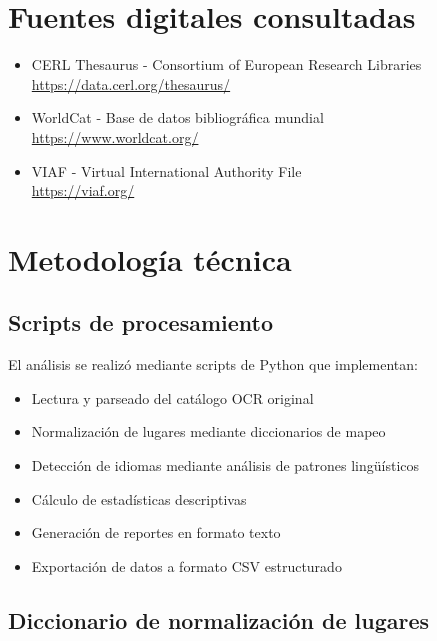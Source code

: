\documentclass[12pt,a4paper]{article}
\begin{document}
\section{Fuentes digitales consultadas}

\begin{itemize}
    \item CERL Thesaurus - Consortium of European Research Libraries\\
    \url{https://data.cerl.org/thesaurus/}

    \item WorldCat - Base de datos bibliográfica mundial\\
    \url{https://www.worldcat.org/}

    \item VIAF - Virtual International Authority File\\
    \url{https://viaf.org/}
\end{itemize}

\newpage

\appendix

\section{Metodología técnica}

\subsection{Scripts de procesamiento}

El análisis se realizó mediante scripts de Python que implementan:

\begin{itemize}
    \item Lectura y parseado del catálogo OCR original
    \item Normalización de lugares mediante diccionarios de mapeo
    \item Detección de idiomas mediante análisis de patrones lingüísticos
    \item Cálculo de estadísticas descriptivas
    \item Generación de reportes en formato texto
    \item Exportación de datos a formato CSV estructurado
\end{itemize}

\subsection{Diccionario de normalización de lugares}
\end{document}
